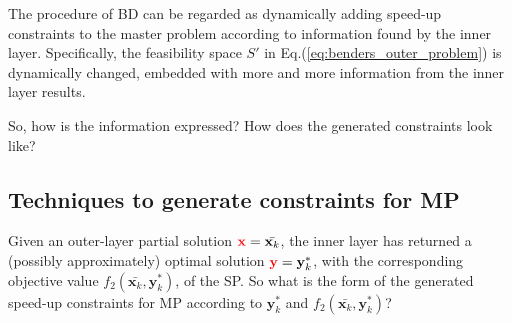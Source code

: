 \documentclass[twocolumn]{ctexart}
\begin{document}
The procedure of BD can be regarded as
dynamically adding speed-up constraints to the master problem
according to information found by the inner layer.
Specifically, the feasibility space $ S'$ in Eq.(\ref{eq:benders_outer_problem}) is dynamically changed,
embedded with more and more information
from the inner layer results.

So, how is the information expressed? How does the generated constraints look like?


\subsection{Techniques to generate constraints for MP}

Given an outer-layer partial solution $\mathbf{\color{red} x} = \bar{\mathbf{x}_k}$,
the inner layer has returned a (possibly approximately) optimal solution $\mathbf{\color{red} y} = \mathbf{y}^*_k$,
with the corresponding objective value $f_2(  \bar{\mathbf{x}_k}  ,  \mathbf{y}^*_k  )$,
of the SP.
So what is the form of the generated speed-up constraints for MP according to $\mathbf{y}^*_k$ and $f_2(  \bar{\mathbf{x}_k}  ,  \mathbf{y}^*_k  )$?


\end{document}
